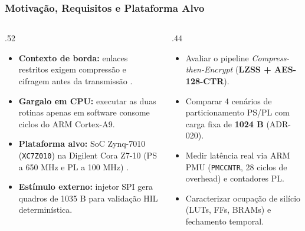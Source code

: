 \begin{frame}
  \frametitle{Motiva\c{c}\~ao, Requisitos e Plataforma Alvo}
  \begin{columns}[T]
    \begin{column}{.52\textwidth}
      \begin{itemize}
        \item \textbf{Contexto de borda:} enlaces restritos exigem compress\~ao e cifragem antes da transmiss\~ao \autocite{NISTSP80038A}.
        \item \textbf{Gargalo em CPU:} executar as duas rotinas apenas em software consome ciclos do ARM Cortex-A9.
        \item \textbf{Plataforma alvo:} SoC Zynq-7010 (\texttt{XC7Z010}) na Digilent Cora Z7-10 (PS a 650 MHz e PL a 100 MHz) \autocite{DigilentCoraZ7,XilinxUG585}.
        \item \textbf{Est\'imulo externo:} injetor SPI gera quadros de 1035 B para valida\c{c}\~ao HIL determin\'istica.
      \end{itemize}
    \end{column}
    \begin{column}{.44\textwidth}
      \begin{pontoschave}
        \begin{itemize}
          \item Avaliar o pipeline \textit{Compress-then-Encrypt} (\textbf{LZSS + AES-128-CTR}).
          \item Comparar 4 cen\'arios de particionamento PS/PL com carga fixa de \textbf{1024 B} (ADR-020).
          \item Medir lat\^encia real via ARM PMU (\texttt{PMCCNTR}, 28 ciclos de overhead) e contadores PL.
          \item Caracterizar ocupa\c{c}\~ao de sil\'icio (LUTs, FFs, BRAMs) e fechamento temporal.
        \end{itemize}
      \end{pontoschave}
    \end{column}
  \end{columns}
\end{frame}
